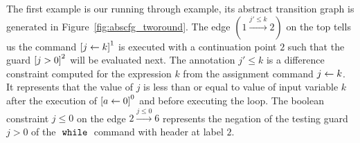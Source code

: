 The first example is our running through example, its abstract transition graph is generated
in Figure~\ref{fig:abscfg_tworound}.
The edge $(1 \xrightarrow{j' \leq k} 2)$ on the top tells us the command 
$\clabel{\assign{j}{k}}^1$ is executed with a continuation point $2$ such that the
guard $\clabel{j > 0}^2$ will be evaluated next.
The annotation $j' \leq k$ is a difference constraint 
computed for
the expression $k$ from the assignment command $\mathrel{ j \leftarrow k }$.
It represents that the value of $j$ is less than or equal to value of input variable $k$ after the
execution of $\clabel{\assign{a}{0}}^0$ and before executing the loop.
The boolean constraint $j \leq 0 $ on the edge $2 \xrightarrow{j \leq 0} 6$
represents the negation of the testing guard $j > 0$
of the $\;\mathtt{while}\;$ command with header at label $2$.
